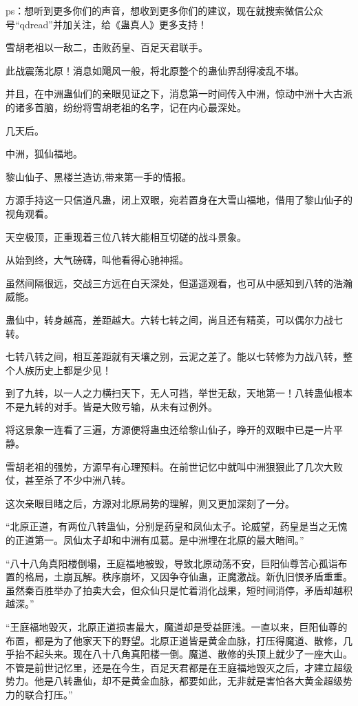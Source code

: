 
\begin{this_body}

ps：想听到更多你们的声音，想收到更多你们的建议，现在就搜索微信公众号“qdread”并加关注，给《蛊真人》更多支持！

雪胡老祖以一敌二，击败药皇、百足天君联手。

此战震荡北原！消息如飓风一般，将北原整个的蛊仙界刮得凌乱不堪。

并且，在中洲蛊仙们的亲眼见证之下，消息第一时间传入中洲，惊动中洲十大古派的诸多首脑，纷纷将雪胡老祖的名字，记在内心最深处。

几天后。

中洲，狐仙福地。

黎山仙子、黑楼兰造访,带来第一手的情报。

方源手持这一只信道凡蛊，闭上双眼，宛若置身在大雪山福地，借用了黎山仙子的视角观看。

天空极顶，正重现着三位八转大能相互切磋的战斗景象。

从始到终，大气磅礴，叫他看得心驰神摇。

虽然间隔很远，交战三方远在白天深处，但遥遥观看，也可从中感知到八转的浩瀚威能。

蛊仙中，转身越高，差距越大。六转七转之间，尚且还有精英，可以偶尔力战七转。

七转八转之间，相互差距就有天壤之别，云泥之差了。能以七转修为力战八转，整个人族历史上都是少见！

到了九转，以一人之力横扫天下，无人可挡，举世无敌，天地第一！八转蛊仙根本不是九转的对手。皆是大败亏输，从未有过例外。

将这景象一连看了三遍，方源便将蛊虫还给黎山仙子，睁开的双眼中已是一片平静。

雪胡老祖的强势，方源早有心理预料。在前世记忆中就叫中洲狠狠此了几次大败仗，甚至杀了不少中洲八转。

这次亲眼目睹之后，方源对北原局势的理解，则又更加深刻了一分。

“北原正道，有两位八转蛊仙，分别是药皇和凤仙太子。论威望，药皇是当之无愧的正道第一。凤仙太子却和中洲有瓜葛。是中洲埋在北原的最大暗间。”

“八十八角真阳楼倒塌，王庭福地被毁，导致北原动荡不安，巨阳仙尊苦心孤诣布置的格局，土崩瓦解。秩序崩坏，又因争夺仙蛊，正魔激战。新仇旧恨矛盾重重。虽然秦百胜举办了拍卖大会，但众仙只是忙着消化战果，短时间消停，矛盾却越积越深。”

“王庭福地毁灭，北原正道损害最大，魔道却是受益匪浅。一直以来，巨阳仙尊的布置，都是为了他家天下的野望。北原正道皆是黄金血脉，打压得魔道、散修，几乎抬不起头来。现在八十八角真阳楼一倒。魔道、散修的头顶上就少了一座大山。不管是前世记忆里，还是在今生，百足天君都是在王庭福地毁灭之后，才建立超级势力。他是八转蛊仙，却不是黄金血脉，都要如此，无非就是害怕各大黄金超级势力的联合打压。”


\end{this_body}
